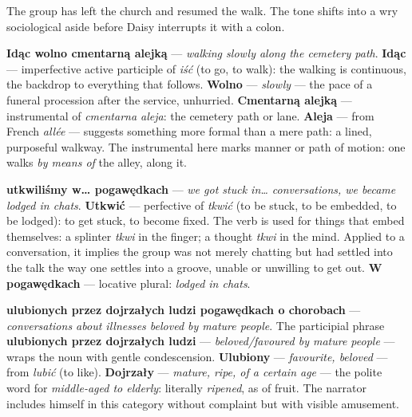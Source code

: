 

The group has left the church and resumed the walk.
The tone shifts into a wry sociological aside before
Daisy interrupts it with a colon.

\textbf{Idąc wolno cmentarną alejką} --- \textit{walking
slowly along the cemetery path}. \textbf{Idąc} ---
imperfective active participle of \textit{iść} (to go,
to walk): the walking is continuous, the backdrop to
everything that follows. \textbf{Wolno} ---
\textit{slowly} --- the pace of a funeral procession
after the service, unhurried. \textbf{Cmentarną alejką}
--- instrumental of \textit{cmentarna aleja}: the
cemetery path or lane. \textbf{Aleja} --- from French
\textit{allée} --- suggests something more formal than
a mere path: a lined, purposeful walkway. The
instrumental here marks manner or path of motion:
one walks \textit{by means of} the alley, along it.

\textbf{utkwiliśmy w\ldots{} pogawędkach} ---
\textit{we got stuck in\ldots{} conversations, we
became lodged in chats}. \textbf{Utkwić} --- perfective
of \textit{tkwić} (to be stuck, to be embedded, to be
lodged): to get stuck, to become fixed. The verb is
used for things that embed themselves: a splinter
\textit{tkwi} in the finger; a thought \textit{tkwi}
in the mind. Applied to a conversation, it implies the
group was not merely chatting but had settled into the
talk the way one settles into a groove, unable or
unwilling to get out. \textbf{W pogawędkach} ---
locative plural: \textit{lodged in chats}.

\textbf{ulubionych przez dojrzałych ludzi pogawędkach
o chorobach} --- \textit{conversations about illnesses
beloved by mature people}. The participial phrase
\textbf{ulubionych przez dojrzałych ludzi} ---
\textit{beloved/favoured by mature people} --- wraps
the noun with gentle condescension. \textbf{Ulubiony}
--- \textit{favourite, beloved} --- from \textit{lubić}
(to like). \textbf{Dojrzały} --- \textit{mature, ripe,
of a certain age} --- the polite word for
\textit{middle-aged to elderly}: literally
\textit{ripened}, as of fruit. The narrator includes
himself in this category without complaint but with
visible amusement.

